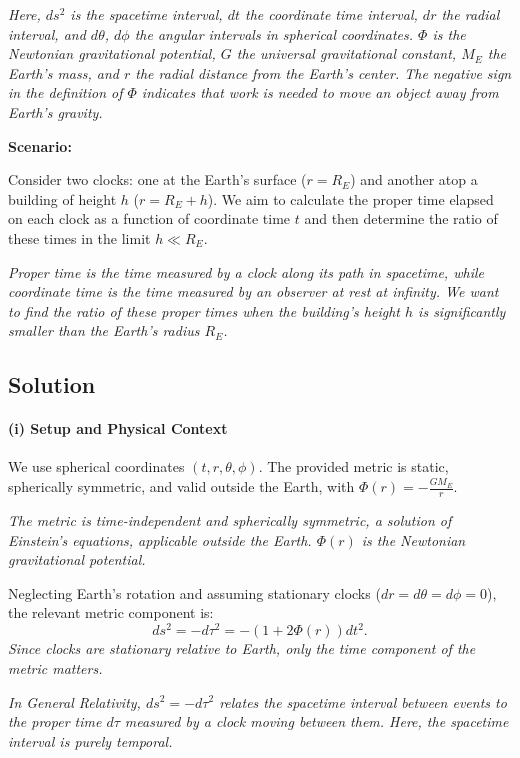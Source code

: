 \documentclass{article}
\begin{document}
\textit{Here, $ds^2$ is the spacetime interval, $dt$ the coordinate time interval, $dr$ the radial interval, and $d\theta$, $d\phi$ the angular intervals in spherical coordinates. $\Phi$ is the Newtonian gravitational potential, $G$ the universal gravitational constant, $M_E$ the Earth's mass, and $r$ the radial distance from the Earth's center. The negative sign in the definition of $\Phi$ indicates that work is needed to move an object away from Earth's gravity.}

\textbf{Scenario:}

Consider two clocks: one at the Earth's surface ($r = R_E$) and another atop a building of height $h$ ($r = R_E + h$). We aim to calculate the proper time elapsed on each clock as a function of coordinate time $t$ and then determine the ratio of these times in the limit $h \ll R_E$.

\textit{Proper time is the time measured by a clock along its path in spacetime, while coordinate time is the time measured by an observer at rest at infinity. We want to find the ratio of these proper times when the building's height $h$ is significantly smaller than the Earth's radius $R_E$.}

\subsection*{Solution}

\paragraph{(i) Setup and Physical Context}

We use spherical coordinates $(t, r, \theta, \phi)$. The provided metric is static, spherically symmetric, and valid outside the Earth, with $\Phi(r) = -\frac{GM_E}{r}$.

\textit{The metric is time-independent and spherically symmetric, a solution of Einstein's equations, applicable outside the Earth. $\Phi(r)$ is the Newtonian gravitational potential.}

Neglecting Earth's rotation and assuming stationary clocks ($dr = d\theta = d\phi = 0$), the relevant metric component is:
\[
ds^2 = -d\tau^2 = -\left(1 + 2\Phi(r)\right)dt^2.
\]
\textit{Since clocks are stationary relative to Earth, only the time component of the metric matters.}

\textit{In General Relativity, $ds^2 = -d\tau^2$ relates the spacetime interval between events to the proper time $d\tau$ measured by a clock moving between them. Here, the spacetime interval is purely temporal.}
\end{document}
